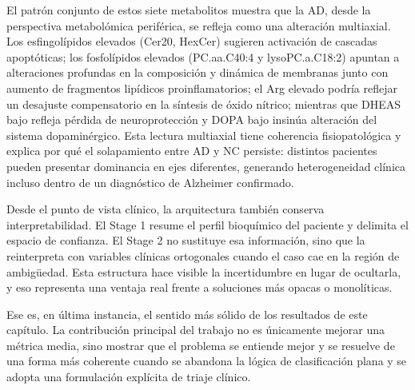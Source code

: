 El patrón conjunto de estos siete metabolitos muestra que la AD, desde la perspectiva metabolómica periférica, se refleja como una alteración multiaxial. Los esfingolípidos elevados (Cer20, HexCer) sugieren activación de cascadas apoptóticas; los fosfolípidos elevados (PC.aa.C40:4 y lysoPC.a.C18:2) apuntan a alteraciones profundas en la composición y dinámica de membranas junto con aumento de fragmentos lipídicos proinflamatorios; el Arg elevado podría reflejar un desajuste compensatorio en la síntesis de óxido nítrico; mientras que DHEAS bajo refleja pérdida de neuroprotección y DOPA bajo insinúa alteración del sistema dopaminérgico. Esta lectura multiaxial tiene coherencia fisiopatológica y explica por qué el solapamiento entre AD y NC persiste: distintos pacientes pueden presentar dominancia en ejes diferentes, generando heterogeneidad clínica incluso dentro de un diagnóstico de Alzheimer confirmado.

Desde el punto de vista clínico, la arquitectura también conserva interpretabilidad. El Stage 1 resume el perfil bioquímico del paciente y delimita el espacio de confianza. El Stage 2 no sustituye esa información, sino que la reinterpreta con variables clínicas ortogonales cuando el caso cae en la región de ambigüedad. Esta estructura hace visible la incertidumbre en lugar de ocultarla, y eso representa una ventaja real frente a soluciones más opacas o monolíticas.

Ese es, en última instancia, el sentido más sólido de los resultados de este capítulo. La contribución principal del
trabajo no es únicamente mejorar una métrica media, sino mostrar que el problema se entiende mejor y se resuelve de una
forma más coherente cuando se abandona la lógica de clasificación plana y se adopta una formulación explícita de triaje
clínico.